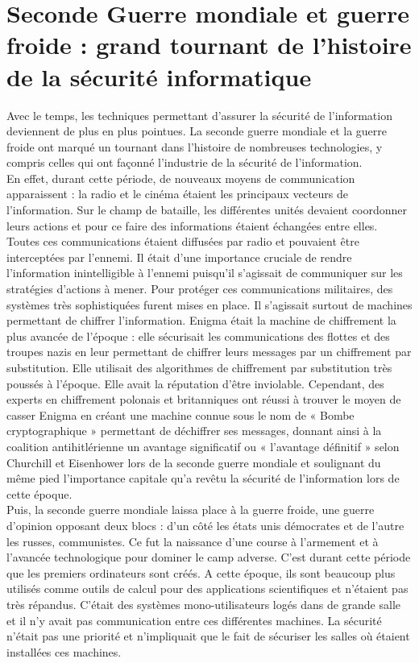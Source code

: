 \section{Seconde Guerre mondiale et guerre froide : grand tournant de l'histoire de la sécurité informatique}
Avec le temps, les techniques permettant d’assurer la sécurité de l’information deviennent de plus en plus pointues. La seconde guerre mondiale et la guerre froide ont marqué un tournant dans l’histoire de nombreuses technologies, y compris celles qui ont façonné l’industrie de la sécurité de l’information. \\
En effet, durant cette période, de nouveaux moyens de communication apparaissent : la radio et le cinéma étaient les principaux vecteurs de l’information. Sur le champ de bataille, les différentes unités devaient coordonner leurs actions et pour ce faire des informations étaient échangées entre elles. Toutes ces communications étaient diffusées par radio et pouvaient être interceptées par l’ennemi. Il était d’une importance cruciale de rendre l’information inintelligible à l’ennemi puisqu’il s’agissait de communiquer sur les stratégies d’actions à mener. Pour protéger ces communications militaires, des systèmes très sophistiquées furent mises en place. Il s’agissait surtout de machines permettant de chiffrer l’information. Enigma était la machine de chiffrement la plus avancée de l’époque : elle sécurisait  les communications des flottes et des troupes nazis en leur permettant de chiffrer leurs messages par un chiffrement par substitution. Elle utilisait des algorithmes de chiffrement par substitution très poussés à l’époque. Elle avait la réputation d'être inviolable. Cependant, des experts en chiffrement polonais et britanniques ont réussi à trouver le moyen de casser Enigma en créant une machine connue sous le nom de « Bombe cryptographique » permettant de déchiffrer ses messages, donnant ainsi à la coalition antihitlérienne un avantage significatif  ou « l’avantage définitif » selon Churchill et Eisenhower  lors de la seconde guerre mondiale et soulignant du même pied l’importance capitale qu’a revêtu la sécurité de l’information lors de cette époque. \\ 
Puis, la seconde guerre mondiale laissa place à la guerre froide, une guerre d’opinion opposant deux blocs : d’un côté les états unis démocrates et de l’autre les russes, communistes. Ce fut la naissance d’une course à l’armement et à l’avancée technologique pour dominer le camp adverse. 
C’est durant cette période que les premiers ordinateurs sont créés. A cette époque, ils sont beaucoup plus utilisés comme outils de calcul pour des applications scientifiques et n’étaient pas très répandus. C’était des systèmes mono-utilisateurs logés dans de grande salle et il n’y avait pas communication entre ces différentes machines. La sécurité n’était pas une priorité et n’impliquait que le fait de sécuriser les salles où étaient installées ces machines. 
